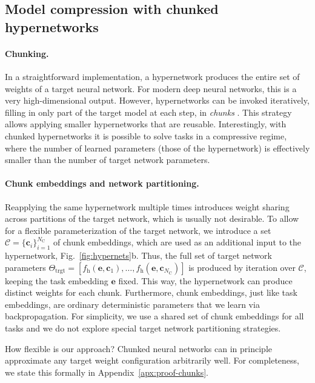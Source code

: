 \documentclass{article}
\begin{document}
\subsection{Model compression with chunked hypernetworks}
\label{sec:compression}

\paragraph{Chunking.} In a straightforward implementation, a hypernetwork produces the entire set of weights of a target neural network. For modern deep neural networks, this is a very high-dimensional output.
However, hypernetworks can be invoked iteratively, filling in only part of the target model at each step, in \emph{chunks} \citep{ha_hypernetworks_2017,pawlowski_implicit_2017}. This strategy allows applying smaller hypernetworks that are reusable. Interestingly, with chunked hypernetworks it is possible to solve tasks in a compressive regime, where the number of learned parameters (those of the hypernetwork) is effectively smaller than the number of target network parameters. 



\paragraph{Chunk embeddings and network partitioning.} Reapplying the same hypernetwork multiple times introduces weight sharing across partitions of the target network, which is usually not desirable. To allow for a flexible parameterization of the target network, we introduce a set $\mathcal{C} = \{\mathbf{c}_i\}_{i=1}^{N_\text{C}}$ of chunk embeddings, which are used as an additional input to the hypernetwork, Fig.~\ref{fig:hypernets}b. Thus, the full set of target network parameters $\Theta_\text{trgt} = [f_\text{h}(\mathbf{e}, \mathbf{c}_1), \ldots, f_\text{h}(\mathbf{e}, \mathbf{c}_{N_\text{C}})]$ is produced by iteration over $\mathcal{C}$, keeping the task embedding $\mathbf{e}$ fixed. This way, the hypernetwork can produce distinct weights for each chunk. Furthermore, chunk embeddings, just like task embeddings, are ordinary deterministic parameters that we learn via backpropagation. For simplicity, we use a shared set of chunk embeddings for all tasks and we do not explore special target network partitioning strategies.

How flexible is our approach? Chunked neural networks can in principle approximate any target weight configuration arbitrarily well. For completeness, we state this formally in Appendix~\ref{apx:proof-chunks}.
 
\end{document}
